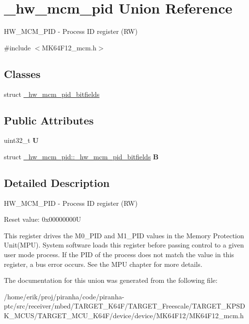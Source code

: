 \hypertarget{union__hw__mcm__pid}{}\section{\+\_\+hw\+\_\+mcm\+\_\+pid Union Reference}
\label{union__hw__mcm__pid}


H\+W\+\_\+\+M\+C\+M\+\_\+\+P\+ID -\/ Process ID register (RW)  




{\ttfamily \#include $<$M\+K64\+F12\+\_\+mcm.\+h$>$}

\subsection*{Classes}
\begin{DoxyCompactItemize}
\item 
struct \hyperlink{struct__hw__mcm__pid_1_1__hw__mcm__pid__bitfields}{\+\_\+hw\+\_\+mcm\+\_\+pid\+\_\+bitfields}
\end{DoxyCompactItemize}
\subsection*{Public Attributes}
\begin{DoxyCompactItemize}
\item 
uint32\+\_\+t {\bfseries U}\hypertarget{union__hw__mcm__pid_a0aaa6aadf86a50ba4bb57c06dcb0fd97}{}\label{union__hw__mcm__pid_a0aaa6aadf86a50ba4bb57c06dcb0fd97}

\item 
struct \hyperlink{struct__hw__mcm__pid_1_1__hw__mcm__pid__bitfields}{\+\_\+hw\+\_\+mcm\+\_\+pid\+::\+\_\+hw\+\_\+mcm\+\_\+pid\+\_\+bitfields} {\bfseries B}\hypertarget{union__hw__mcm__pid_afa806eeb9b0869937a96f07b2314bc64}{}\label{union__hw__mcm__pid_afa806eeb9b0869937a96f07b2314bc64}

\end{DoxyCompactItemize}


\subsection{Detailed Description}
H\+W\+\_\+\+M\+C\+M\+\_\+\+P\+ID -\/ Process ID register (RW) 

Reset value\+: 0x00000000U

This register drives the M0\+\_\+\+P\+ID and M1\+\_\+\+P\+ID values in the Memory Protection Unit(\+M\+P\+U). System software loads this register before passing control to a given user mode process. If the P\+ID of the process does not match the value in this register, a bus error occurs. See the M\+PU chapter for more details. 

The documentation for this union was generated from the following file\+:\begin{DoxyCompactItemize}
\item 
/home/erik/proj/piranha/code/piranha-\/ptc/src/receiver/mbed/\+T\+A\+R\+G\+E\+T\+\_\+\+K64\+F/\+T\+A\+R\+G\+E\+T\+\_\+\+Freescale/\+T\+A\+R\+G\+E\+T\+\_\+\+K\+P\+S\+D\+K\+\_\+\+M\+C\+U\+S/\+T\+A\+R\+G\+E\+T\+\_\+\+M\+C\+U\+\_\+\+K64\+F/device/device/\+M\+K64\+F12/M\+K64\+F12\+\_\+mcm.\+h\end{DoxyCompactItemize}

